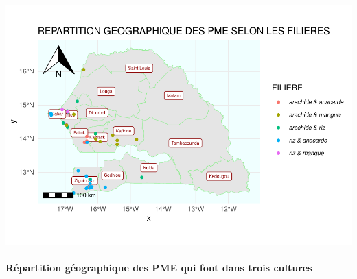 \documentclass[
]{article}
\begin{document}
\begin{center}\includegraphics{Projet_R_ISE_1_files/figure-latex/unnamed-chunk-39-1} \end{center}

\hfill\break

\hypertarget{ruxe9partition-guxe9ographique-des-pme-qui-font-dans-trois-cultures}{%
\paragraph{Répartition géographique des PME qui font dans trois
cultures}\label{ruxe9partition-guxe9ographique-des-pme-qui-font-dans-trois-cultures}}

\hfill\break
\end{document}
